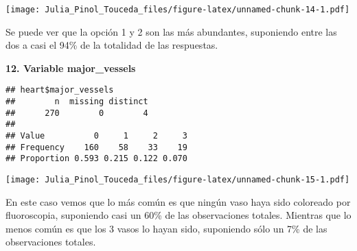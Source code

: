 \documentclass[]{article}
\newenvironment{Shaded}{\begin{snugshade}}{\end{snugshade}}
\newcommand{\KeywordTok}[1]{\textcolor[rgb]{0.13,0.29,0.53}{\textbf{#1}}}
\newcommand{\DataTypeTok}[1]{\textcolor[rgb]{0.13,0.29,0.53}{#1}}
\newcommand{\DecValTok}[1]{\textcolor[rgb]{0.00,0.00,0.81}{#1}}
\newcommand{\StringTok}[1]{\textcolor[rgb]{0.31,0.60,0.02}{#1}}
\newcommand{\OperatorTok}[1]{\textcolor[rgb]{0.81,0.36,0.00}{\textbf{#1}}}
\newcommand{\NormalTok}[1]{#1}
\begin{document}
\texttt{[image: Julia\_Pinol\_Touceda\_files/figure-latex/unnamed-chunk-14-1.pdf]}

Se puede ver que la opción 1 y 2 son las más abundantes, suponiendo
entre las dos a casi el 94\% de la totalidad de las respuestas.

\textbf{12. Variable major\_vessels}

\begin{Shaded}
\end{Shaded}

\begin{verbatim}
## heart$major_vessels 
##        n  missing distinct 
##      270        0        4 
##                                   
## Value          0     1     2     3
## Frequency    160    58    33    19
## Proportion 0.593 0.215 0.122 0.070
\end{verbatim}

\begin{Shaded}
\end{Shaded}

\texttt{[image: Julia\_Pinol\_Touceda\_files/figure-latex/unnamed-chunk-15-1.pdf]}

En este caso vemos que lo más común es que ningún vaso haya sido
coloreado por fluoroscopia, suponiendo casi un 60\% de las observaciones
totales. Mientras que lo menos común es que los 3 vasos lo hayan sido,
suponiendo sólo un 7\% de las observaciones totales.
\end{document}
